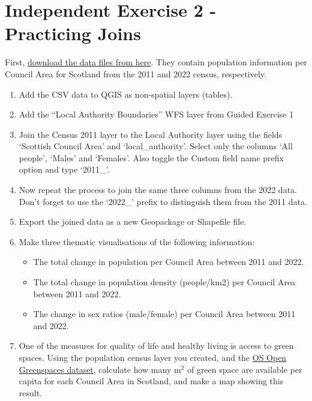 \documentclass[
  letterpaper,
  DIV=11,
  numbers=noendperiod]{scrreprt}
\providecommand{\tightlist}{%
  \setlength{\itemsep}{0pt}\setlength{\parskip}{0pt}}\usepackage{longtable,booktabs,array}
\begin{document}
\section{Independent Exercise 2 - Practicing
Joins}\label{independent-exercise-2---practicing-joins}

First,
\href{https://stir-my.sharepoint.com/:u:/g/personal/ala2_stir_ac_uk/EUBu4Ns8Rw5NskcNdkV9_oEBCu1LwAEV8HyFA3NQksyvvA?e=Jb5Fl9}{download
the data files from here}. They contain population information per
Council Area for Scotland from the 2011 and 2022 census, respectively.

\begin{enumerate}
\def\labelenumi{\arabic{enumi})}
\item
  Add the CSV data to QGIS as non-spatial layers (tables).
\item
  Add the ``Local Authority Boundaries'' WFS layer from Guided Exercise
  1
\item
  Join the Census 2011 layer to the Local Authority layer using the
  fields `Scottish Council Area' and `local\_authority'. Select only the
  columns `All people', `Males' and `Females'. Also toggle the Custom
  field name prefix option and type `2011\_'.
\item
  Now repeat the process to join the same three columns from the 2022
  data. Don't forget to use the `2022\_' prefix to distinguish them from
  the 2011 data.
\item
  Export the joined data as a new Geopackage or Shapefile file.
\item
  Make three thematic visualisations of the following information:

  \begin{itemize}
  \tightlist
  \item
    The total change in population per Council Area between 2011 and
    2022.
  \item
    The total change in population density (people/km2) per Council Area
    between 2011 and 2022.
  \item
    The change in sex ratios (male/female) per Council Area between 2011
    and 2022.
  \end{itemize}
\item
  One of the measures for quality of life and healthy living is access
  to green spaces. Using the population census layer you created, and
  the \href{https://osdatahub.os.uk/downloads/open/OpenGreenspace}{OS
  Open Greenspaces dataset}, calculate how many m\(^2\) of green space
  are available per capita for each Council Area in Scotland, and make a
  map showing this result.
\end{enumerate}
\end{document}
